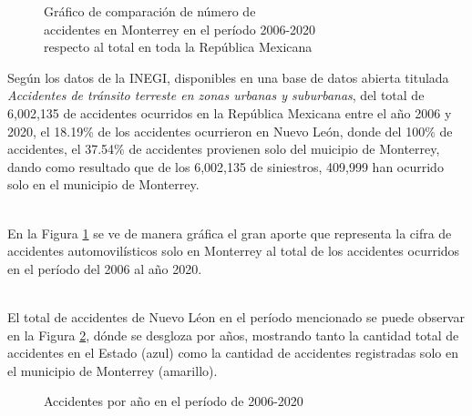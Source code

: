 \documentclass[a4paper]{article}
\begin{document}
\noindent\begin{minipage}{0.5\textwidth}%
\begin{figure}[H]
    \centering

    \caption{Gráfico de comparación de número de\\accidentes en Monterrey en el período 2006-2020\\respecto al total en toda la República Mexicana\\\autocite{DatosInegiDeVerdad}}
    \label{fig:Aporte}
\end{figure}
\end{minipage}%
\hfill%
\begin{minipage}{0.5\textwidth}
Según los datos de la INEGI, disponibles en una base de datos abierta titulada \textit{Accidentes de tránsito terreste en zonas urbanas y suburbanas}, del total de 6,002,135 de accidentes ocurridos en la República Mexicana entre el año 2006 y 2020, el 18.19\% de los accidentes ocurrieron en Nuevo León, donde del 100\% de accidentes, el 37.54\% de accidentes provienen solo del muicipio de Monterrey, dando como resultado que de los 6,002,135 de siniestros, 409,999 han ocurrido solo en el municipio de Monterrey. 

\hspace{0pt}\\
En la Figura \ref{fig:Aporte} se ve de manera gráfica el gran aporte que representa la cifra de accidentes automovilísticos solo en Monterrey al total de los accidentes ocurridos en el período del 2006 al año 2020. 

\autocite{DatosInegiDeVerdad}
\end{minipage}

\hspace{0pt}\\
El total de accidentes de Nuevo Léon en el período mencionado se puede observar en la Figura \ref{fig:Acc}, dónde se desgloza por años, mostrando tanto la cantidad total de accidentes en el Estado (azul) como la cantidad de accidentes registradas solo en el municipio de Monterrey (amarillo).

\begin{figure}[H]
    \centering

    \caption{Accidentes por año en el período de 2006-2020\\\autocite{DatosInegiDeVerdad}}
    \label{fig:Acc}
\end{figure}
\end{document}
